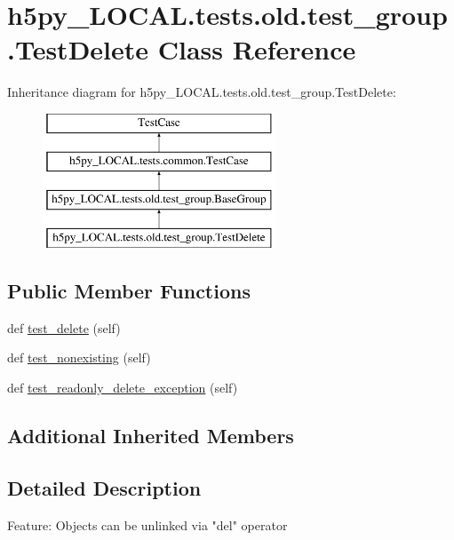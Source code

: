\hypertarget{classh5py__LOCAL_1_1tests_1_1old_1_1test__group_1_1TestDelete}{}\section{h5py\+\_\+\+L\+O\+C\+A\+L.\+tests.\+old.\+test\+\_\+group.\+Test\+Delete Class Reference}
\label{classh5py__LOCAL_1_1tests_1_1old_1_1test__group_1_1TestDelete}
Inheritance diagram for h5py\+\_\+\+L\+O\+C\+A\+L.\+tests.\+old.\+test\+\_\+group.\+Test\+Delete\+:\begin{figure}[H]
\begin{center}
\leavevmode
\includegraphics[height=4.000000cm]{classh5py__LOCAL_1_1tests_1_1old_1_1test__group_1_1TestDelete}
\end{center}
\end{figure}
\subsection*{Public Member Functions}
\begin{DoxyCompactItemize}
\item 
def \hyperlink{classh5py__LOCAL_1_1tests_1_1old_1_1test__group_1_1TestDelete_adc2555c66d294d34ccc3d73eb8686c4c}{test\+\_\+delete} (self)
\item 
def \hyperlink{classh5py__LOCAL_1_1tests_1_1old_1_1test__group_1_1TestDelete_aed7c608ed4654b80235a73122bacbb2a}{test\+\_\+nonexisting} (self)
\item 
def \hyperlink{classh5py__LOCAL_1_1tests_1_1old_1_1test__group_1_1TestDelete_aaa37e66e8cefd3534613f52b6724d312}{test\+\_\+readonly\+\_\+delete\+\_\+exception} (self)
\end{DoxyCompactItemize}
\subsection*{Additional Inherited Members}


\subsection{Detailed Description}
\begin{DoxyVerb}    Feature: Objects can be unlinked via "del" operator
\end{DoxyVerb}
 

